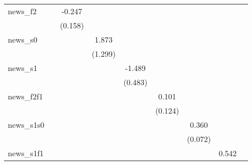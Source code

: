 {\begin{tabular}{l*{8}{c}}
\addlinespace
news\_f2     &                     &      -0.247         &                     &                     &                     &                     &                     &                     \\
            &                     &     (0.158)         &                     &                     &                     &                     &                     &                     \\
\addlinespace
news\_s0     &                     &                     &       1.873         &                     &                     &                     &                     &                     \\
            &                     &                     &     (1.299)         &                     &                     &                     &                     &                     \\
\addlinespace
news\_s1     &                     &                     &                     &      -1.489\sym{***}&                     &                     &                     &                     \\
            &                     &                     &                     &     (0.483)         &                     &                     &                     &                     \\
\addlinespace
news\_f2f1   &                     &                     &                     &                     &       0.101         &                     &                     &                     \\
            &                     &                     &                     &                     &     (0.124)         &                     &                     &                     \\
\addlinespace
news\_s1s0   &                     &                     &                     &                     &                     &       0.360\sym{***}&                     &                     \\
            &                     &                     &                     &                     &                     &     (0.072)         &                     &                     \\
\addlinespace
news\_s1f1   &                     &                     &                     &                     &                     &                     &       0.542         &                     \\

\end{tabular}}
